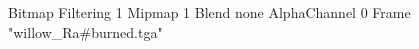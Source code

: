 {Bitmap
	{Filtering 1}
	{Mipmap 1}
	{Blend none}
	{AlphaChannel 0}
	{Frame "willow_Ra#burned.tga"}
}
